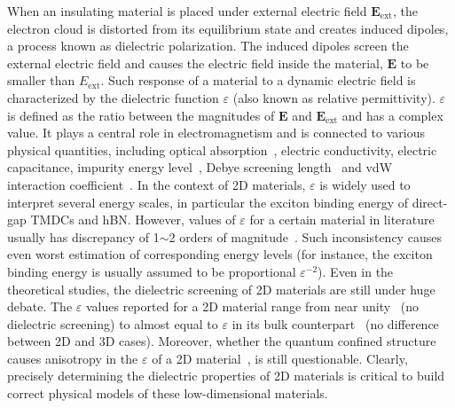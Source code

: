 When an insulating material is placed under external electric field
$\mathbf{E}_{\mathrm{ext}}$, the electron cloud is distorted from its
equilibrium state and creates induced dipoles, a process known as
dielectric polarization. The induced dipoles screen the external
electric field and causes the electric field inside the material,
$\mathbf{E}$ to be smaller than $E_{\mathrm{ext}}$.
%
Such response of a material to a dynamic electric field is
characterized by the dielectric function $\varepsilon$ (also known as
relative permittivity).
%
$\varepsilon$ is defined as the ratio between the magnitudes of
$\mathbf{E}$ and $\mathbf{E}_{\mathrm{ext}}$ and has a complex value.
%
It plays a central role in electromagnetism and is connected to
various physical quantities, including optical
absorption~\cite{Dressel_2001_electrodynamics}, electric conductivity,
electric capacitance, impurity energy level~\cite{Ihn_2009_book},
Debye screening length~\cite{Israelachvili_2011_book} and vdW
interaction coefficient~\parencite{parsegian_van_2010_book}.
%
In the context of 2D materials, $\varepsilon$ is widely used to
interpret several energy scales, in particular the exciton binding
energy of direct-gap TMDCs and hBN.
%
However, values of $\varepsilon$ for a certain material in literature
usually has discrepancy of 1$\sim{}$2 orders of
magnitude~\cite{Li_2016_screening_rev}.
%
Such inconsistency causes even worst estimation of corresponding
energy levels (for instance, the exciton binding energy is usually
assumed to be proportional $\varepsilon^{-2}$).
%
Even in the theoretical studies, the dielectric screening of 2D
materials are still under huge debate.  The $\varepsilon$ values
reported for a 2D material range from near
unity~\cite{Olsen_2016_hydrogen} (\ie no dielectric screening) to
almost equal to $\varepsilon$ in its bulk
counterpart~\cite{Laturia_2018_2D_eps} (\ie no difference between 2D and 3D
cases).
%
Moreover, whether the quantum confined structure causes anisotropy in
the $\varepsilon$ of a 2D material~\cite{Sohier_2016_2D_eps}, is still
questionable.
%
Clearly, precisely determining the dielectric properties of 2D
materials is critical to build correct physical models of these
low-dimensional materials.

